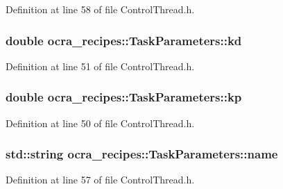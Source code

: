 Definition at line 58 of file Control\+Thread.\+h.

\subsubsection[{\texorpdfstring{kd}{kd}}]{\setlength{\rightskip}{0pt plus 5cm}double ocra\+\_\+recipes\+::\+Task\+Parameters\+::kd}\hypertarget{classocra__recipes_1_1TaskParameters_a8a90d9db17c0faeb26624899264eec9e}{}\label{classocra__recipes_1_1TaskParameters_a8a90d9db17c0faeb26624899264eec9e}


Definition at line 51 of file Control\+Thread.\+h.

\subsubsection[{\texorpdfstring{kp}{kp}}]{\setlength{\rightskip}{0pt plus 5cm}double ocra\+\_\+recipes\+::\+Task\+Parameters\+::kp}\hypertarget{classocra__recipes_1_1TaskParameters_a644ed196f6bf867e46d7faab9ac287b3}{}\label{classocra__recipes_1_1TaskParameters_a644ed196f6bf867e46d7faab9ac287b3}


Definition at line 50 of file Control\+Thread.\+h.

\subsubsection[{\texorpdfstring{name}{name}}]{\setlength{\rightskip}{0pt plus 5cm}std\+::string ocra\+\_\+recipes\+::\+Task\+Parameters\+::name}\hypertarget{classocra__recipes_1_1TaskParameters_a8d9b23fed4d4207bed2b48625acb8910}{}\label{classocra__recipes_1_1TaskParameters_a8d9b23fed4d4207bed2b48625acb8910}


Definition at line 57 of file Control\+Thread.\+h.

